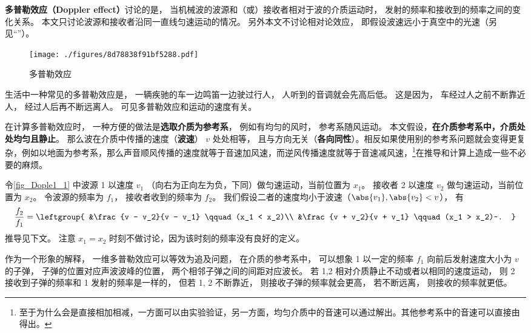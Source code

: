 

\textbf{多普勒效应（Doppler effect）}讨论的是， 当机械波的波源和（或）接收者相对于波的介质运动时， 发射的频率和接收到的频率之间的变化关系。 本文只讨论波源和接收者沿同一直线匀速运动的情况。 另外本文不讨论相对论效应， 即假设波速远小于真空中的光速（另见“”）。

\begin{figure}[ht]
\centering
\texttt{[image: ./figures/8d78838f91bf5288.pdf]}
\caption{多普勒效应} \label{fig_Dople1_1}
\end{figure}

\begin{example}{}
生活中一种常见的多普勒效应是， 一辆疾驰的车一边鸣笛一边驶过行人， 人听到的音调就会先高后低。 这是因为， 车经过人之前不断靠近人， 经过人后再不断远离人。 可见多普勒效应和运动的速度有关。
\end{example}

在计算多普勒效应时， 一种方便的做法是\textbf{选取介质为参考系}， 例如有均匀的风时， 参考系随风运动。 本文假设，\textbf{在介质参考系中，介质处处均匀且静止}。 那么波在介质中传播的速度（\textbf{波速}） $v$ 处处相等， 且与方向无关（\textbf{各向同性}）。相反如果使用别的参考系问题就会变得更复杂，例如以地面为参考系，那么声音顺风传播的速度就等于音速加风速，而逆风传播速度就等于音速减风速，\footnote{至于为什么会是直接相加相减，一方面可以由实验验证，另一方面，均匀介质中的音速可以通过解出。其他参考系中的音速可以直接由得出。}在推导和计算上造成一些不必要的麻烦。

令\autoref{fig_Dople1_1} 中波源 1 以速度 $v_1$ （向右为正向左为负，下同）做匀速运动，当前位置为 $x_1$。 接收者 2 以速度 $v_2$ 做匀速运动，当前位置为 $x_2$。 令波源的频率为 $f_1$， 接收者收到的频率为 $f_2$。 我们假设二者的速度均小于波速（$\abs{v_1}, \abs{v_2} < v$）， 有
\begin{equation}\label{eq_Dople1_1}
\frac{f_2}{f_1} = \leftgroup{
&\frac{v - v_2}{v - v_1} \qquad (x_1 < x_2)\\
&\frac{v + v_2}{v + v_1} \qquad (x_1 > x_2)~.
}\end{equation}
推导见下文。 注意 $x_1=x_2$ 时刻不做讨论，因为该时刻的频率没有良好的定义。

作为一个形象的解释， 一维多普勒效应可以等效为追及问题， 在介质的参考系中， 可以想象 1 以一定的频率 $f_1$ 向前后发射速度大小为 $v$ 的子弹， 子弹的位置对应声波波峰的位置， 两个相邻子弹之间的间距对应波长。 若 1,2 相对介质静止不动或者以相同的速度运动， 则 2 接收到子弹的频率和 1 发射的频率是一样的， 但若 1, 2 不断靠近， 则接收子弹的频率就会更高， 若不断远离， 则接收的频率就更低。

